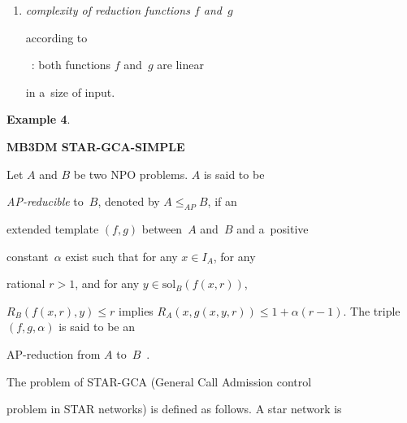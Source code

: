 \begin{multicols}{2}
\begin{enumerate}[(1)]
{to}~\cite{AERW2002}: 3q


machines and 5q jobs are defined  which implies the inflation of input to be 8q.


The run time complexity of the used approximation scheme of {SUM


OF SQUARED MACHINE


LOADS} is quadratic in input size; and


\item {\it complexity of reduction functions $f$ and~$g$


according to}~\cite{AERW2002}: both functions $f$ and~$g$ are linear


in a~size of input.


\end{enumerate}





\smallskip





\noindent


\textbf{Example 4}.


\textbf{MB3DM {} STAR-GCA-SIMPLE}





\smallskip





\noindent


Let $A$ and $B$ be two NPO problems. $A$ is said to be


\textit{AP-reducible} to~$B$, denoted by $A\leq_{AP}B$, if an


extended template $(f,g)$ between~$A$ and~$B$ and a~positive


constant~$\alpha$ exist such that for any $x \in I_{A}$, for any


rational $r> 1$, and for any $y \in \mathrm{sol}_{B}(f(x,r))$,


$R_{B}(f(x,r),y) \leq r$ implies $R_{A}(x,g(x,y,r)) \leq 1 +


\alpha(r-1)$. The triple $(f,g,\alpha)$ is said to be an


AP-reduction from $A$ to~$B$~\cite{TrevisanLuca}.





The problem of {STAR-GCA} (General Call Admission control


problem in STAR networks) is defined as follows. A star network is



\end{multicols}
